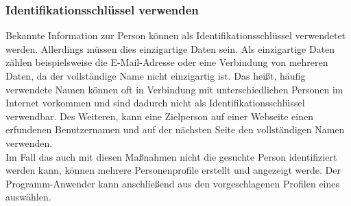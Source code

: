 \subsubsection{Identifikationsschlüssel verwenden}
Bekannte Information zur Person können als Identifikationsschlüssel verwendetet werden. Allerdings müssen dies einzigartige Daten sein. Als einzigartige Daten zählen beispielsweise die E-Mail-Adresse oder eine Verbindung von mehreren Daten, da der vollständige Name nicht einzigartig ist. Das heißt, häufig verwendete Namen können oft in Verbindung mit unterschiedlichen Personen im Internet vorkommen und sind dadurch nicht als Identifikationsschlüssel verwendbar. Des Weiteren, kann eine Zielperson auf einer Webseite einen erfundenen Benutzernamen und auf der nächsten Seite den vollständigen Namen verwenden.\\

Im Fall das auch mit diesen Maßnahmen nicht die gesuchte Person identifiziert werden kann, können mehrere Personenprofile erstellt und angezeigt werde. Der Programm-Anwender kann anschließend aus den vorgeschlagenen Profilen eines auswählen.  

